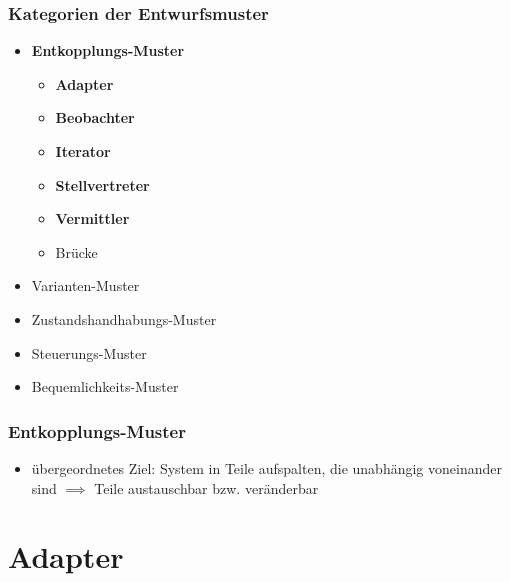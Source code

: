 \documentclass[18pt]{beamer}
\begin{document}
	\begin{frame}
		\frametitle{Kategorien der Entwurfsmuster}
		\begin{itemize}
			\item \textbf{Entkopplungs-Muster}
				\begin{itemize}
					\item \textbf{Adapter}
					\item \textbf{Beobachter}
					\item \textbf{Iterator}
					\item \textbf{Stellvertreter}
					\item \textbf{Vermittler}
					\item Brücke
				\end{itemize}
			\item Varianten-Muster
			\item Zustandshandhabungs-Muster
			\item Steuerungs-Muster
			\item Bequemlichkeits-Muster
		\end{itemize}
	\end{frame}

	\begin{frame}
		\frametitle{Entkopplungs-Muster}
		\begin{itemize}
			\item übergeordnetes Ziel: System in Teile aufspalten, die unabhängig voneinander sind
			\linebreak $\implies$ Teile austauschbar bzw. veränderbar
	\end{itemize}
	\end{frame}

\section{Adapter}
\end{document}
